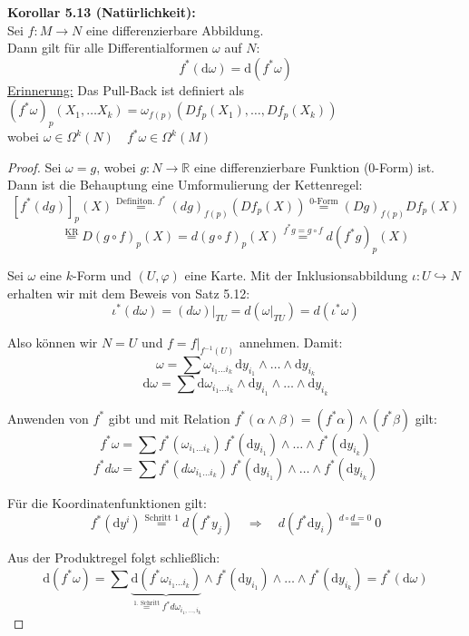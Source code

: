 \documentclass[fleqn, 12pt, letterpaper]{article}
\newcommand{\txt}[1]{\text{#1}}
\begin{document}
\textbf{Korollar 5.13 (Natürlichkeit):} \\ 
Sei \( f : M \to N \) eine differenzierbare Abbildung. \\
Dann gilt für alle Differentialformen \( \omega \) auf \( N \):
\[
f^*(\mathrm{d} \omega) = \mathrm{d}(f^* \omega)
\]
\underline{Erinnerung:} Das Pull-Back ist definiert als $(f^*\omega)_p(X_1,\dots X_k)=\omega_{f(p)}(Df_p(X_1),\dots,Df_p(X_k))$\\
wobei $\omega\in \Omega^k(N)\quad f^*\omega\in \Omega^k(M)$
\begin{proof}
Sei \( \omega = g \), wobei \( g : N \to \mathbb{R} \) eine differenzierbare Funktion (0-Form) ist. \\
Dann ist die Behauptung eine Umformulierung der Kettenregel:
\[
\left[ f^*(dg) \right]_p(X)
\overset{\txt{Definiton. }f^*}{=} (dg)_{f(p)} \left( Df_p(X) \right) \overset{\txt{0-Form}}{=} (Dg)_{f(p)} Df_p(X)
\]
\[
\overset{\text{KR}}{=} D(g \circ f)_p(X) = d(g \circ f)_p(X)
\overset{f^*g=g\circ f}{=} d(f^*g)_p(X)
\]

Sei \( \omega \) eine \( k \)-Form und \( (U, \varphi) \) eine Karte. Mit der Inklusionsabbildung \( \iota: U \hookrightarrow N \) \\
erhalten wir mit dem Beweis von Satz 5.12:
\[
\iota^*(d\omega)
= (d\omega)|_{T U}
= d(\omega|_{T U})
= d(\iota^*\omega)
\]


Also können wir \( N = U \) und \( f = \left. f \right|_{f^{-1}(U)} \) annehmen. Damit:
\[
\omega = \sum \omega_{i_1 \dots i_k} \, \mathrm{d}y_{i_1} \wedge \dots \wedge \mathrm{d}y_{i_k}
\]
\[
\mathrm{d}\omega = \sum \mathrm{d}\omega_{i_1 \dots i_k} \wedge \mathrm{d}y_{i_1} \wedge \dots \wedge \mathrm{d}y_{i_k}
\]

Anwenden von \( f^* \) gibt und mit Relation $f^*(\alpha\wedge \beta)=(f^*\alpha)\wedge (f^*\beta)$ gilt:
\[
f^*\omega = \sum f^*(\omega_{i_1 \dots i_k}) \, f^*(\mathrm{d}y_{i_1}) \wedge \dots \wedge f^*(\mathrm{d}y_{i_k})     
\]
\[
f^*d\omega = \sum f^*(d\omega_{i_1 \dots i_k}) \, f^*(\mathrm{d}y_{i_1}) \wedge \dots \wedge f^*(\mathrm{d}y_{i_k})
\]

Für die Koordinatenfunktionen gilt:
\[
f^*(\mathrm{d}y^i) \overset{\txt{Schritt 1}}{=} d(f^*y_j)
\quad \Rightarrow \quad
d(f^*\mathrm{d}y_i) \overset{d\circ d = 0}{=} 0
\]

Aus der Produktregel folgt schließlich:
\[
\mathrm{d}(f^* \omega) = \sum \underbrace{\mathrm{d}(f^*\omega_{i_1 \dots i_k})}_{\overset{\txt{1. Schritt}}{=}f^*d\omega_{i_1,\dots,i_k}} \wedge f^*(\mathrm{d}y_{i_1}) \wedge \dots \wedge f^*(\mathrm{d}y_{i_k})
= f^*(\mathrm{d}\omega)
\]
\end{proof}
\end{document}

